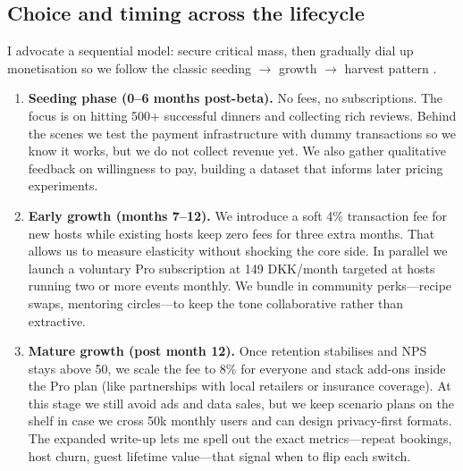 \subsection*{Choice and timing across the lifecycle}
I advocate a sequential model: secure critical mass, then gradually dial up monetisation so we follow the classic seeding $\rightarrow$ growth $\rightarrow$ harvest pattern \citep{Choudary2016}.
\begin{enumerate}
  \item \textbf{Seeding phase (0--6 months post-beta).} No fees, no subscriptions. The focus is on hitting 500+ successful dinners and collecting rich reviews. Behind the scenes we test the payment infrastructure with dummy transactions so we know it works, but we do not collect revenue yet. We also gather qualitative feedback on willingness to pay, building a dataset that informs later pricing experiments.
  \item \textbf{Early growth (months 7--12).} We introduce a soft 4\% transaction fee for new hosts while existing hosts keep zero fees for three extra months. That allows us to measure elasticity without shocking the core side. In parallel we launch a voluntary Pro subscription at 149 DKK/month targeted at hosts running two or more events monthly. We bundle in community perks---recipe swaps, mentoring circles---to keep the tone collaborative rather than extractive.
  \item \textbf{Mature growth (post month 12).} Once retention stabilises and NPS stays above 50, we scale the fee to 8\% for everyone and stack add-ons inside the Pro plan (like partnerships with local retailers or insurance coverage). At this stage we still avoid ads and data sales, but we keep scenario plans on the shelf in case we cross 50k monthly users and can design privacy-first formats. The expanded write-up lets me spell out the exact metrics---repeat bookings, host churn, guest lifetime value---that signal when to flip each switch.
\end{enumerate}

